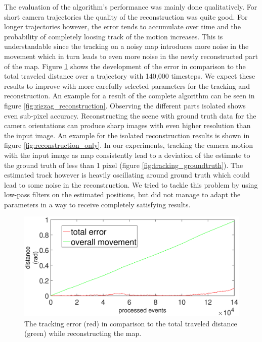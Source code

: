 The evaluation of the algorithm's performance was mainly done qualitatively.
For short camera trajectories the quality of the reconstruction was quite good.
For longer trajectories however, the error tends to accumulate over time and the
probability of completely loosing track of the motion increases.
This is understandable since the tracking on a noisy map introduces more noise
in the movement which in turn leads to even more noise in the newly reconstructed
part of the map.
Figure \ref{fig:tracking_error_reconstruction} shows the development of the error
in comparison to the total traveled distance over a trajectory with 140,000 timesteps.
We expect these results to improve with more carefully selected parameters for the
tracking and reconstruction.
An example for a result of the complete algorithm can be seen in figure \ref{fig:zigzag_reconstruction}.
Observing the different parts isolated shows even sub-pixel accuracy.
Reconstructing the scene with ground truth data for the camera orientations can produce sharp images
with even higher resolution than the input image. An example for the isolated reconstruction results
is shown in figure \ref{fig:reconstruction_only}.
In our experiments, tracking the camera motion with the input image as map consistently lead to a deviation
of the estimate to the ground truth of less than 1 pixel (figure \ref{fig:tracking_groundtruth}). The estimated track however is heavily oscillating
around ground truth which could lead to some noise in the reconstruction. We tried to tackle
this problem by using low-pass filters on the estimated positions, but did not manage to
adapt the parameters in a way to receive completely satisfying results.

\begin{figure}
\includegraphics[width=\linewidth]{images/Tracking_error_during_reconstruction.eps}
\caption{The tracking error (red) in comparison to the total traveled distance (green)
while reconstructing the map.}
\label{fig:tracking_error_reconstruction}
\end{figure}


